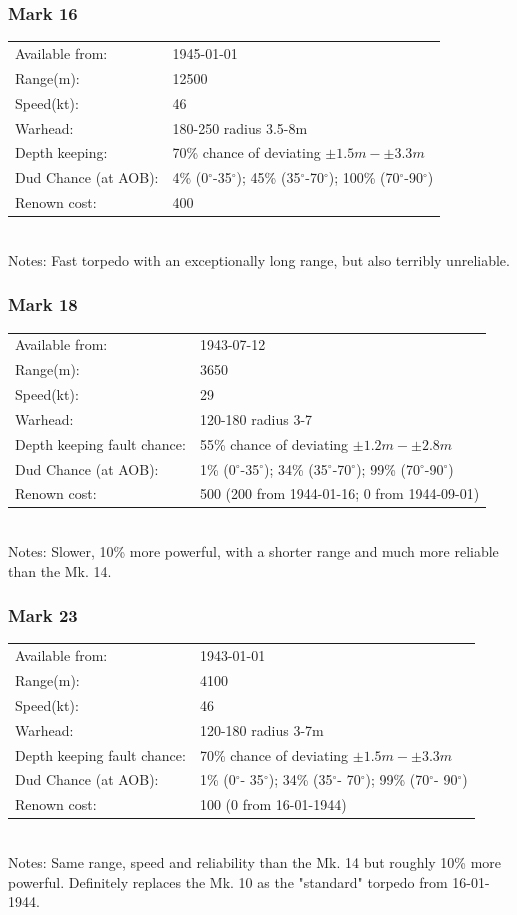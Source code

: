 \documentclass{article}
\newcommand{\degree}{$^{\circ}$}
\begin{document}
\subsubsection{Mark 16}
\begin{tabular}{l|l}
Available from:& 1945-01-01\\
Range(m):& 12500\\
Speed(kt):&46\\
Warhead:& 180-250 radius 3.5-8m\\
Depth keeping:&  70\% chance of deviating $\pm 1.5m - \pm 3.3m$\\
Dud Chance (at AOB):& 4\% (0\degree-35\degree); 45\% (35\degree-70\degree); 100\% (70\degree-90\degree)\\
Renown cost:& 400\\
\end{tabular} \\
Notes: Fast torpedo with an exceptionally long range, but also terribly unreliable.

\subsubsection{Mark 18}
\begin{tabular}{l|l}
Available from:& 1943-07-12\\
Range(m):& 3650\\
Speed(kt):&29\\
Warhead:& 120-180 radius 3-7\\
Depth keeping fault chance:& 55\% chance of deviating $\pm 1.2m - \pm 2.8m$\\
Dud Chance (at AOB):& 1\% (0\degree-35\degree); 34\% (35\degree-70\degree); 99\% (70\degree-90\degree)\\
Renown cost:&  500 (200 from 1944-01-16; 0 from 1944-09-01)\\
\end{tabular} \\
Notes: Slower, 10\% more powerful, with a shorter range and much more reliable than the Mk. 14.

\subsubsection{Mark 23}
\begin{tabular}{l|l}
Available from:& 1943-01-01\\
Range(m):& 4100\\
Speed(kt):&46\\
Warhead:& 120-180 radius 3-7m\\
Depth keeping fault chance:& 70\% chance of deviating $\pm 1.5m - \pm 3.3m$\\
Dud Chance (at AOB):& 1\% (0\degree - 35\degree); 34\% (35\degree- 70\degree); 99\% (70\degree- 90\degree)\\
Renown cost:&  100 (0 from 16-01-1944)\\
\end{tabular} \\
Notes: Same range, speed and reliability than the Mk. 14 but roughly 10\% more powerful. Definitely replaces the Mk. 10 as the "standard" torpedo from 16-01-1944.
\end{document}
